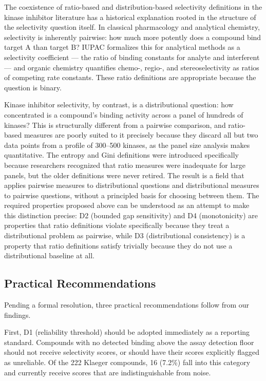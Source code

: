 \documentclass[journal=jcisd8,manuscript=article]{achemso}
\begin{document}
The coexistence of ratio-based and distribution-based selectivity definitions
in the kinase inhibitor literature has a historical explanation rooted in the
structure of the selectivity question itself.
In classical pharmacology and analytical chemistry, selectivity is inherently
pairwise: how much more potently does a compound bind target A than target B?
IUPAC formalizes this for analytical methods as a selectivity coefficient ---
the ratio of binding constants for analyte and interferent --- and organic
chemistry quantifies chemo-, regio-, and stereoselectivity as ratios of
competing rate constants.\cite{IUPAC2001}
These ratio definitions are appropriate because the question is binary.

Kinase inhibitor selectivity, by contrast, is a distributional question: how
concentrated is a compound's binding activity across a panel of hundreds of
kinases?
This is structurally different from a pairwise comparison, and ratio-based
measures are poorly suited to it precisely because they discard all but two
data points from a profile of 300--500 kinases, as the panel size analysis
makes quantitative.
The entropy and Gini definitions were introduced specifically because
researchers recognized that ratio measures were inadequate for large panels,
but the older definitions were never retired.
The result is a field that applies pairwise measures to distributional
questions and distributional measures to pairwise questions, without a
principled basis for choosing between them.
The required properties proposed above can be understood as an attempt
to make this distinction precise: D2 (bounded gap sensitivity) and D4
(monotonicity) are properties that ratio definitions violate specifically
because they treat a distributional problem as pairwise, while D3
(distributional consistency) is a property that ratio definitions satisfy
trivially because they do not use a distributional baseline at all.

\subsection{Practical Recommendations}

Pending a formal resolution, three practical recommendations follow from our
findings.

First, D1 (reliability threshold) should be adopted immediately as a reporting
standard.
Compounds with no detected binding above the assay detection floor should not
receive selectivity scores, or should have their scores explicitly flagged as
unreliable.
Of the 222 Klaeger compounds, 16 (7.2\%) fall into this category and currently
receive scores that are indistinguishable from noise.
\end{document}
